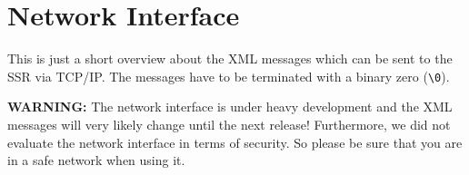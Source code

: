 
\section{Network Interface}
\label{sec:network}

This is just a short overview about the XML messages which can be sent to the
SSR via TCP/IP.
The messages have to be terminated with a binary zero (\verb|\0|).

\textbf{WARNING:} The network interface is under heavy development and the XML
messages will very likely change until the next release! Furthermore, we
did not evaluate the network interface in terms of security. So please be sure
that you are in a safe network when using it.



